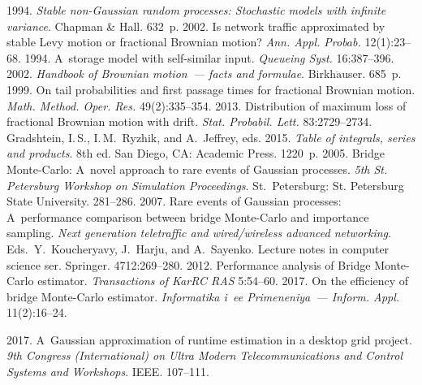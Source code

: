 \begin{multicols}{2}
{{\begin{thebibliography}{99}
 1994.  \textit{Stable non-Gaussian random processes: 
Stochastic models with infinite variance}. Chapman \& Hall. 632~p.
2002. Is network traffic approximated by stable Levy motion or fractional Brownian 
motion? \textit{Ann. Appl. Probab.} 12(1):23--68.
 1994. A~storage model with self-similar input.  
\textit{Queueing Syst.} 16:387--396.
 2002.  \textit{Handbook of Brownian motion~--- 
facts and formulae}. Birkh$\ddot{\mbox{a}}$user. 685~p.
 1999. On tail probabilities and first passage times for fractional 
Brownian motion.  \textit{Math. Method. Oper. Res.} 49(2):335--354.
 2013. Distribution of maximum loss of fractional 
Brownian motion with drift.  \textit{Stat. Probabil. Lett.} 83:2729--2734.
Gradshtein, I.\,S., I.\,M.~Ryzhik, and A.~Jeffrey, eds.
2015. 
\textit{Table of integrals, series and products}. 8th ed. 
San Diego, CA: Academic Press. 1220~p.
 2005. Bridge Monte-Carlo: A~novel approach to rare events of Gaussian processes. 
 \textit{5th St. Petersburg Workshop on Simulation Proceedings}. St.\ Petersburg: 
 St. Petersburg State University. 281--286.
 2007. Rare events of Gaussian processes: A~performance comparison between 
 bridge Monte-Carlo and importance sampling. 
 \textit{Next generation teletraffic and wired/wireless advanced networking}.
 Eds.\ Y.~Koucheryavy, J.~Harju, and A.~Sayenko.
 Lecture notes in computer science ser.
 Springer. 4712:269--280.
2012. Performance analysis of Bridge Monte-Carlo estimator. 
\textit{Transactions of KarRC RAS} 5:54--60.
 2017. On the efficiency of bridge Monte-Carlo estimator.  
 \textit{Informatika i~ee Primeneniya~--- Inform.  Appl.} 11(2):16--24.
 
2017. A~Gaussian approximation of runtime estimation in a desktop grid project. 
\textit{9th  Congress (International) on Ultra Modern Telecommunications and 
Control Systems and Workshops}. IEEE. 107--111.


\end{thebibliography} } }

\end{multicols}


